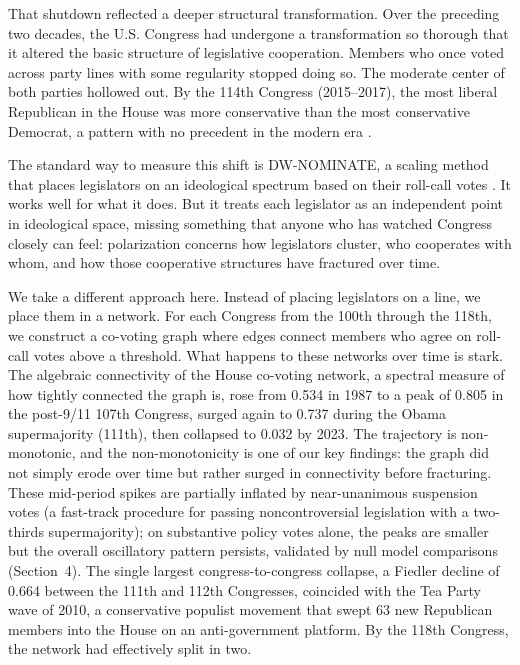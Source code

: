 \documentclass[12pt, a4paper]{article}
\begin{document}
That shutdown reflected a deeper structural transformation. Over the preceding two decades, the U.S. Congress had undergone a transformation so thorough that it altered the basic structure of legislative cooperation. Members who once voted across party lines with some regularity stopped doing so. The moderate center of both parties hollowed out. By the 114th Congress (2015--2017), the most liberal Republican in the House was more conservative than the most conservative Democrat, a pattern with no precedent in the modern era \citep{poole2017}.

The standard way to measure this shift is DW-NOMINATE, a scaling method that places legislators on an ideological spectrum based on their roll-call votes \citep{poole1985}. It works well for what it does. But it treats each legislator as an independent point in ideological space, missing something that anyone who has watched Congress closely can feel: polarization concerns how legislators cluster, who cooperates with whom, and how those cooperative structures have fractured over time.

We take a different approach here. Instead of placing legislators on a line, we place them in a network. For each Congress from the 100th through the 118th, we construct a co-voting graph where edges connect members who agree on roll-call votes above a threshold. What happens to these networks over time is stark. The algebraic connectivity of the House co-voting network, a spectral measure of how tightly connected the graph is, rose from 0.534 in 1987 to a peak of 0.805 in the post-9/11 107th Congress, surged again to 0.737 during the Obama supermajority (111th), then collapsed to 0.032 by 2023. The trajectory is non-monotonic, and the non-monotonicity is one of our key findings: the graph did not simply erode over time but rather surged in connectivity before fracturing. These mid-period spikes are partially inflated by near-unanimous suspension votes (a fast-track procedure for passing noncontroversial legislation with a two-thirds supermajority); on substantive policy votes alone, the peaks are smaller but the overall oscillatory pattern persists, validated by null model comparisons (Section~4). The single largest congress-to-congress collapse, a Fiedler decline of 0.664 between the 111th and 112th Congresses, coincided with the Tea Party wave of 2010, a conservative populist movement that swept 63 new Republican members into the House on an anti-government platform. By the 118th Congress, the network had effectively split in two.
\end{document}
